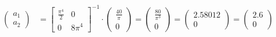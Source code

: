 \documentclass[
final,
a4paper,
oneside,
parskip=full,
headings=standardclasses,
headings=big,
pointednumbers,
fleqn
]{scrartcl}
\newcommand{\f}[2]{\frac{#1}{#2}}
\begin{document}
    {\setlength{\abovedisplayskip}{6pt}
    \setlength{\belowdisplayskip}{-12pt}
    \begin{align*}
        \begin{pmatrix}
            a_1 \\
            a_2
        \end{pmatrix} & =
        \begin{bmatrix}
            \f{\pi^4}{2} & 0 \\
            0             & 8\pi^4
        \end{bmatrix}^{-1} \cdot
        \begin{pmatrix}
            \f{40}{\pi} \\
            0
        \end{pmatrix} =
        \begin{pmatrix}
            \f{80}{\pi^3} \\
            0
        \end{pmatrix} =
        \begin{pmatrix}
            2.58012 \\
            0
        \end{pmatrix} =
        \begin{pmatrix}
            2.6 \\
            0
        \end{pmatrix}
    \end{align*}}
\end{document}
